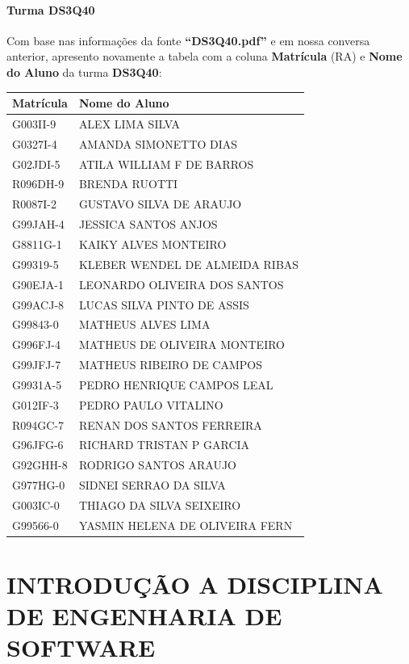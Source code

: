 \documentclass[
]{book}
\begin{document}
\subsubsection{Turma DS3Q40}\label{turma-ds3q40}

Com base nas informações da fonte \textbf{``DS3Q40.pdf''} e em nossa conversa anterior, apresento novamente a tabela com a coluna \textbf{Matrícula} (RA) e \textbf{Nome do Aluno} da turma \textbf{DS3Q40}:

\begin{longtable}[]{@{}ll@{}}
\toprule\noalign{}
Matrícula & Nome do Aluno \\
\midrule\noalign{}
\endhead
\bottomrule\noalign{}
\endlastfoot
G003II-9 & ALEX LIMA SILVA \\
G0327I-4 & AMANDA SIMONETTO DIAS \\
G02JDI-5 & ATILA WILLIAM F DE BARROS \\
R096DH-9 & BRENDA RUOTTI \\
R0087I-2 & GUSTAVO SILVA DE ARAUJO \\
G99JAH-4 & JESSICA SANTOS ANJOS \\
G8811G-1 & KAIKY ALVES MONTEIRO \\
G99319-5 & KLEBER WENDEL DE ALMEIDA RIBAS \\
G90EJA-1 & LEONARDO OLIVEIRA DOS SANTOS \\
G99ACJ-8 & LUCAS SILVA PINTO DE ASSIS \\
G99843-0 & MATHEUS ALVES LIMA \\
G996FJ-4 & MATHEUS DE OLIVEIRA MONTEIRO \\
G99JFJ-7 & MATHEUS RIBEIRO DE CAMPOS \\
G9931A-5 & PEDRO HENRIQUE CAMPOS LEAL \\
G012IF-3 & PEDRO PAULO VITALINO \\
R094GC-7 & RENAN DOS SANTOS FERREIRA \\
G96JFG-6 & RICHARD TRISTAN P GARCIA \\
G92GHH-8 & RODRIGO SANTOS ARAUJO \\
G977HG-0 & SIDNEI SERRAO DA SILVA \\
G003IC-0 & THIAGO DA SILVA SEIXEIRO \\
G99566-0 & YASMIN HELENA DE OLIVEIRA FERN \\
\end{longtable}

\chapter*{INTRODUÇÃO A DISCIPLINA DE ENGENHARIA DE SOFTWARE}\label{introduuxe7uxe3o-a-disciplina-de-engenharia-de-software}
\end{document}
